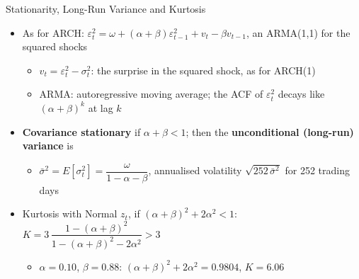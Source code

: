 \begin{frame}{Stationarity, Long-Run Variance and Kurtosis}
\itemsize{\small}
\begin{itemize}
    \item As for ARCH: $\varepsilon_t^2 = \omega + (\alpha + \beta)\varepsilon_{t-1}^2 + v_t - \beta v_{t-1}$, an ARMA(1,1) for the squared shocks
    \begin{itemize}
        \item $v_t = \varepsilon_t^2 - \sigma_t^2$: the surprise in the squared shock, as for ARCH(1)
        \item ARMA: autoregressive moving average; the ACF of $\varepsilon_t^2$ decays like $(\alpha + \beta)^k$ at lag $k$
    \end{itemize}
    \item \textbf{Covariance stationary} if $\alpha + \beta < 1$; then the \textbf{unconditional (long-run) variance} is
    \begin{itemize}
        \item $\bar\sigma^2 = E[\sigma_t^2] = \dfrac{\omega}{1 - \alpha - \beta}$, \quad annualised volatility $\sqrt{252\,\bar\sigma^2}$ for 252 trading days
    \end{itemize}
    \item Kurtosis with Normal $z_t$, if $(\alpha + \beta)^2 + 2\alpha^2 < 1$: $K = 3\,\dfrac{1 - (\alpha + \beta)^2}{1 - (\alpha + \beta)^2 - 2\alpha^2} > 3$
    \begin{itemize}
        \item $\alpha = 0.10$, $\beta = 0.88$: $(\alpha + \beta)^2 + 2\alpha^2 = 0.9804$, $K = 6.06$
    \end{itemize}
\end{itemize}
\end{frame}

